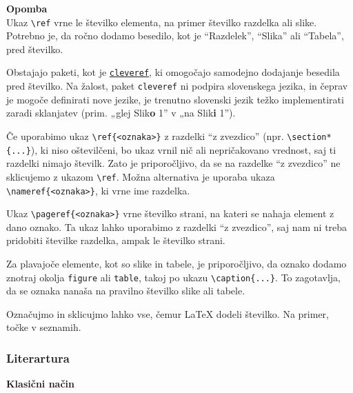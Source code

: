 \begin{framed}
\textbf{Opomba}\\
Ukaz \texttt{{\textbackslash}ref} vrne le številko elementa, na primer številko razdelka ali slike. Potrebno je, da ročno dodamo besedilo, kot je ``Razdelek'', ``Slika'' ali ``Tabela'', pred številko.

Obstajajo paketi, kot je \href{https://ctan.org/pkg/cleveref?lang=en}{\texttt{cleveref}}, ki omogočajo samodejno dodajanje besedila pred številko. Na žalost, paket \texttt{cleveref} ni podpira slovenskega jezika, in čeprav je mogoče definirati nove jezike, je trenutno slovenski jezik težko implementirati zaradi sklanjatev (prim. „glej  Slik\textbf{o} 1'' v „na Slik\textbf{i} 1'').
\end{framed}

Če uporabimo ukaz \texttt{{\textbackslash}ref\{\textless oznaka\textgreater \}} z razdelki ``z zvezdico'' (npr. \texttt{{\textbackslash}section*\{...\}}), ki niso oštevilčeni, bo ukaz vrnil nič ali nepričakovano vrednost, saj ti razdelki nimajo številk.
Zato je priporočljivo, da se na razdelke ``z zvezdico'' ne sklicujemo z ukazom \texttt{{\textbackslash}ref}.
Možna alternativa je uporaba ukaza \texttt{{\textbackslash}nameref\{\textless oznaka\textgreater \}}, ki vrne ime razdelka.

Ukaz \texttt{{\textbackslash}pageref\{\textless oznaka\textgreater \}} vrne številko strani, na kateri se nahaja element z dano oznako.
Ta ukaz lahko uporabimo z razdelki ``z zvezdico'', saj nam ni treba pridobiti številke razdelka, ampak le številko strani.

Za plavajoče elemente, kot so slike in tabele, je priporočljivo, da oznako dodamo znotraj okolja \texttt{figure} ali \texttt{table}, takoj po ukazu \texttt{{\textbackslash}caption\{...\}}.
To zagotavlja, da se oznaka nanaša na pravilno številko slike ali tabele.

\begin{example}\label{eg_sklici_2}\end{example}Označujmo in sklicujmo lahko vse, čemur LaTeX dodeli številko. Na primer, točke v seznamih.

\begin{example}\label{eg_sklici_3}\end{example}\subsubsection{Literartura}

\textbf{Klasični način}

